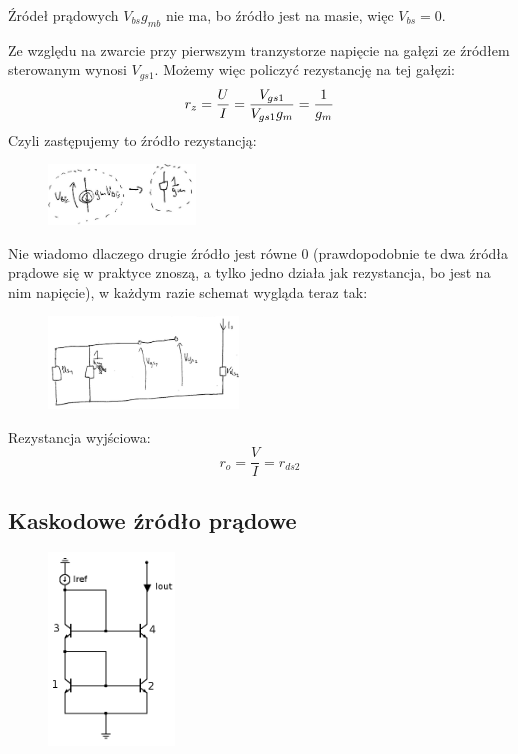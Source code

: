 \documentclass[10pt,a4paper]{article}
\begin{document}
Źródeł prądowych $V_{bs}g_{mb}$ nie ma, bo źródło jest na masie, więc $V_{bs} = 0$.

Ze względu na zwarcie przy pierwszym tranzystorze napięcie na gałęzi ze źródłem sterowanym wynosi $V_{gs1}$. Możemy więc policzyć rezystancję na tej gałęzi:
\begin{equation}
r_z = {U \over I} = {V_{gs1} \over V_{gs1}g_m} = {1 \over g_m}
\end{equation}
Czyli zastępujemy to źródło rezystancją:
\begin{figure}[H]
\centering
\includegraphics[width=0.35\textwidth]{lustr_wyp2.png}
\end{figure}

Nie wiadomo dlaczego drugie źródło jest równe 0 (prawdopodobnie te dwa źródła prądowe się w praktyce znoszą, a tylko jedno działa jak rezystancja, bo jest na nim napięcie), w każdym razie schemat wygląda teraz tak:
\begin{figure}[H]
\centering
\includegraphics[width=0.45\textwidth]{lustr_wyp3.png}
\end{figure}

Rezystancja wyjściowa: 
\begin{equation}
r_o = \dfrac{V}{I} = r_{ds2}
\end{equation}

\subsection{Kaskodowe źródło prądowe}
\begin{figure}[H]
\centering
\includegraphics[width=0.3\textwidth]{kaskoda.png}
\end{figure}
\end{document}
